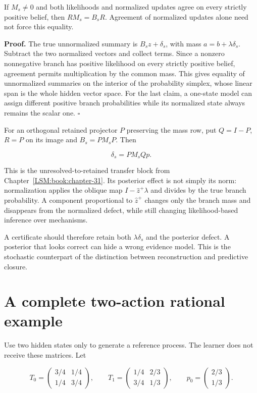 If \(M_s\neq0\) and both likelihoods and normalized updates agree on
every strictly positive belief, then \(RM_s=B_sR\). Agreement of
normalized updates alone need not force this equality.

\textbf{Proof.} The true unnormalized summary is \(B_sz+\delta_s\), with
mass \(a=b+\lambda\delta_s\). Subtract the two normalized vectors and
collect terms. Since a nonzero nonnegative branch has positive
likelihood on every strictly positive belief, agreement permits
multiplication by the common mass. This gives equality of unnormalized
summaries on the interior of the probability simplex, whose linear span
is the whole hidden vector space. For the last claim, a one-state model
can assign different positive branch probabilities while its normalized
state always remains the scalar one. \(\square\)

For an orthogonal retained projector \(P\) preserving the mass row, put
\(Q=I-P\), \(R=P\) on its image and \(B_s=PM_sP\). Then

\[
\delta_s=PM_sQp.
\]

This is the unresolved-to-retained transfer block from Chapter~\ref{LSM:book:chapter-31}. Its
posterior effect is not simply its norm: normalization applies the
oblique map \(I-\widehat z^+\lambda\) and divides by the true branch
probability. A component proportional to \(\widehat z^+\) changes only
the branch mass and disappears from the normalized defect, while still
changing likelihood-based inference over mechanisms.

A certificate should therefore retain both \(\lambda\delta_s\) and the
posterior defect. A posterior that looks correct can hide a wrong
evidence model. This is the stochastic counterpart of the distinction
between reconstruction and predictive closure.

\section{A complete two-action rational example}\label{LSM:a-complete-two-action-rational-example}

Use two hidden states only to generate a reference process. The learner
does not receive these matrices. Let

\[
T_0=\begin{pmatrix}3/4&1/4\\1/4&3/4\end{pmatrix},\qquad
T_1=\begin{pmatrix}1/4&2/3\\3/4&1/3\end{pmatrix},\qquad
p_0=\begin{pmatrix}2/3\\1/3\end{pmatrix}.
\]

